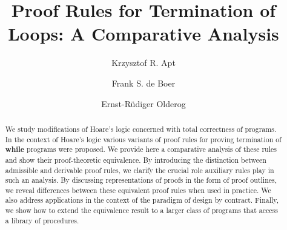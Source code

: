 \documentclass[manuscript, screen, review]{acmart}
\begin{document}

\title[Termination of Loops]%
 {Proof Rules for Termination of Loops: A Comparative Analysis}

\author{Krzysztof R. Apt}

\author{Frank S. de Boer}

\author{Ernst-R\"{u}diger Olderog}



\renewcommand{\shortauthors}{K.R. Apt, F.S. de Boer and E.-R. Olderog}


\begin{abstract}
  We study modifications of Hoare's logic concerned with
  total correctness of programs.
  In the context of Hoare's logic various variants of proof rules for
  proving termination of \textbf{while} programs were proposed.
  We provide here a comparative analysis of these rules and show their
  proof-theoretic equivalence. By introducing the distinction between
  admissible and derivable proof rules, we clarify the crucial role
  auxiliary rules play in such an analysis. By discussing
  representations of proofs in the form of proof outlines, we reveal
  differences between these equivalent proof rules when used in
  practice. We also address applications in the context of the paradigm
  of design by contract.
  Finally, we show how to extend the equivalence result to a larger
  class of programs that access a library of procedures.
\end{abstract}
\end{document}
